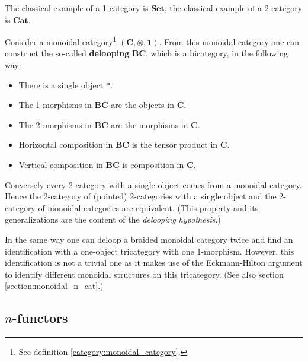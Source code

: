    \begin{example}
        The classical example of a 1-category is $\mathbf{Set}$, the classical example of a 2-category is $\mathbf{Cat}$.
    \end{example}


    \begin{property}\label{cat:monoidal_or_2}
        Consider a monoidal category\footnote{See definition \ref{category:monoidal_category}.} $(\mathbf{C}, \otimes, \mathbf{1})$. From this monoidal category one can construct the so-called \textbf{delooping} $\mathbf{BC}$, which is a bicategory, in the following way:
        \begin{itemize}
            \item There is a single object $\ast$.
            \item The 1-morphisms in $\mathbf{BC}$ are the objects in $\mathbf{C}$.
            \item The 2-morphisms in $\mathbf{BC}$ are the morphisms in $\mathbf{C}$.
            \item Horizontal composition in $\mathbf{BC}$ is the tensor product in $\mathbf{C}$.
            \item Vertical composition in $\mathbf{BC}$ is composition in $\mathbf{C}$.
        \end{itemize}
        Conversely every 2-category with a single object comes from a monoidal category. Hence the 2-category of (pointed) 2-categories with a single object and the 2-category of monoidal categories are equivalent. (This property and its generalizations are the content of the \textit{delooping hypothesis}.)

        In the same way one can deloop a braided monoidal category twice and find an identification with a one-object tricategory with one 1-morphism. However, this identification is not a trivial one as it makes use of the Eckmann-Hilton argument to identify different monoidal structures on this tricategory. (See also section \ref{section:monoidal_n_cat}.)
    \end{property}

\subsection{\texorpdfstring{$n$-functors}{n-functors}}


